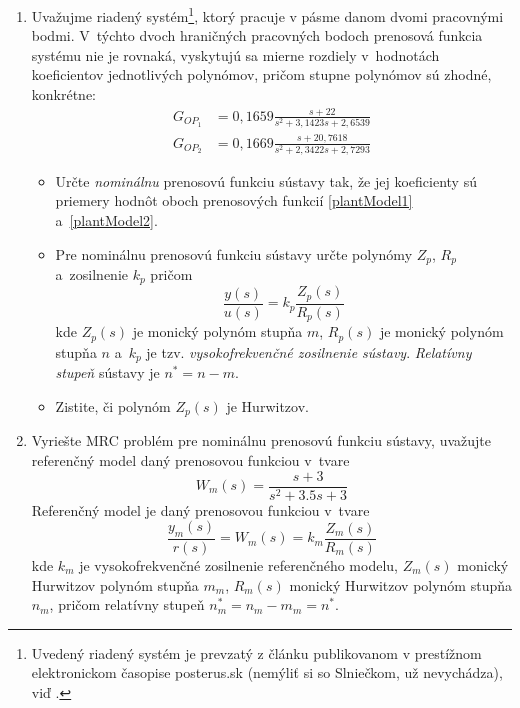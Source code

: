 \documentclass[a4paper, 10pt, ]{article}
\begin{document}
\begin{enumerate}

    \item Uvažujme riadený systém\footnote{Uvedený riadený systém je prevzatý z článku publikovanom v prestížnom elektronickom časopise posterus.sk (nemýliť si so Slniečkom, už nevychádza), viď \cite{Tar11}.}, ktorý pracuje v pásme danom dvomi pracovnými bodmi. V~týchto dvoch hraničných pracovných bodoch prenosová funkcia systému nie je rovnaká, vyskytujú sa mierne rozdiely v~hodnotách koeficientov jednotlivých polynómov, pričom stupne polynómov sú zhodné, konkrétne:
    \begin{align}
    	G_{OP_1} &= 0,1659 \frac{s + 22}{ s^2 + 3,1423 s + 2,6539} 	\label{plantModel1}\\
    	G_{OP_2} &= 0,1669 \frac{s + 20,7618}{s^2 + 2,3422s + 2,7293} \label{plantModel2}
    \end{align}
    \begin{itemize}
    	\item Určte \emph{nominálnu} prenosovú funkciu sústavy tak, že jej koeficienty sú priemery hodnôt oboch prenosových funkcií \eqref{plantModel1} a~\eqref{plantModel2}.

    	\item Pre nominálnu prenosovú funkciu sústavy určte polynómy $Z_p$, $R_p$ a~zosilnenie $k_p$ pričom
    	\begin{equation} \label{C_PFsustavy_MRCp}
    	       \frac{y(s)}{u(s)} = k_p \frac{Z_p(s)}{R_p(s)}
        \end{equation}
        kde $Z_p(s)$ je monický  polynóm stupňa $m$, $R_p(s)$ je monický polynóm stupňa $n$ a~$k_p$ je tzv. \emph{vysokofrekvenčné zosilnenie sústavy}. \emph{Relatívny stupeň} sústavy je $n^* = n - m$.

        \item Zistite, či polynóm $Z_p(s)$ je Hurwitzov.
    \end{itemize}



    \item Vyriešte MRC problém pre nominálnu prenosovú funkciu sústavy, uvažujte referenčný model daný prenosovou funkciou v~tvare
    \begin{equation}
    	W_m(s) = \frac{s + 3}{ s^2 + 3.5 s + 3}
    \end{equation}
    Referenčný model je daný prenosovou funkciou v~tvare
    \begin{equation} \label{C_RefModelMRCp}
    	\frac{y_m(s)}{r(s)} = W_m(s) = k_m \frac{Z_m(s)}{R_m(s)}
    \end{equation}
    kde $k_m$ je vysokofrekvenčné zosilnenie referenčného modelu, $Z_m(s)$ monický Hurwitzov polynóm stupňa $m_m$, $R_m(s)$ monický Hurwitzov polynóm stupňa $n_m$, pričom relatívny stupeň $n^*_m = n_m - m_m = n^*$.


\end{enumerate}
\end{document}
